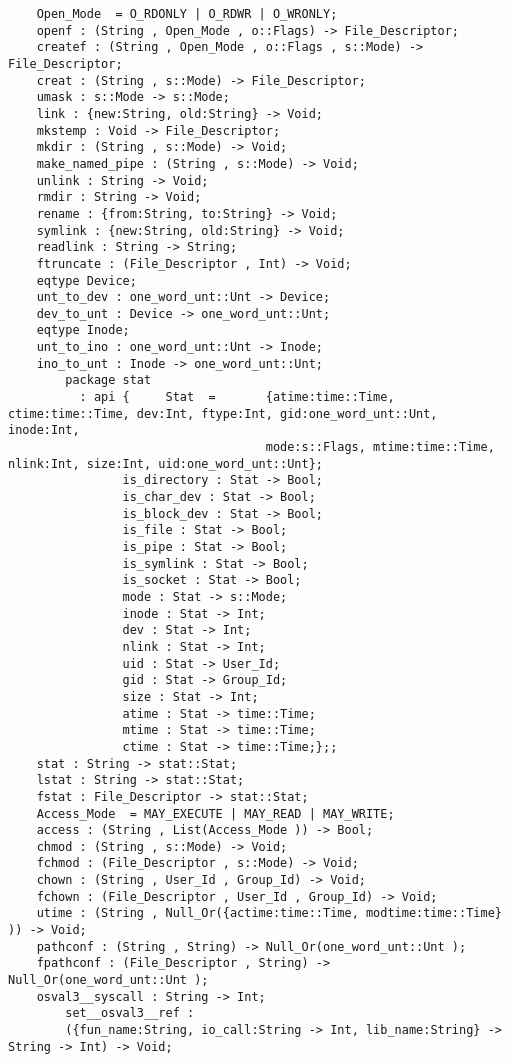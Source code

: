 \begin{verbatim}
    Open_Mode  = O_RDONLY | O_RDWR | O_WRONLY;
    openf : (String , Open_Mode , o::Flags) -> File_Descriptor;
    createf : (String , Open_Mode , o::Flags , s::Mode) -> File_Descriptor;
    creat : (String , s::Mode) -> File_Descriptor;
    umask : s::Mode -> s::Mode;
    link : {new:String, old:String} -> Void;
    mkstemp : Void -> File_Descriptor;
    mkdir : (String , s::Mode) -> Void;
    make_named_pipe : (String , s::Mode) -> Void;
    unlink : String -> Void;
    rmdir : String -> Void;
    rename : {from:String, to:String} -> Void;
    symlink : {new:String, old:String} -> Void;
    readlink : String -> String;
    ftruncate : (File_Descriptor , Int) -> Void;
    eqtype Device;
    unt_to_dev : one_word_unt::Unt -> Device;
    dev_to_unt : Device -> one_word_unt::Unt;
    eqtype Inode;
    unt_to_ino : one_word_unt::Unt -> Inode;
    ino_to_unt : Inode -> one_word_unt::Unt;
        package stat
          : api {     Stat  =       {atime:time::Time, ctime:time::Time, dev:Int, ftype:Int, gid:one_word_unt::Unt, inode:Int,
                                    mode:s::Flags, mtime:time::Time, nlink:Int, size:Int, uid:one_word_unt::Unt};
                is_directory : Stat -> Bool;
                is_char_dev : Stat -> Bool;
                is_block_dev : Stat -> Bool;
                is_file : Stat -> Bool;
                is_pipe : Stat -> Bool;
                is_symlink : Stat -> Bool;
                is_socket : Stat -> Bool;
                mode : Stat -> s::Mode;
                inode : Stat -> Int;
                dev : Stat -> Int;
                nlink : Stat -> Int;
                uid : Stat -> User_Id;
                gid : Stat -> Group_Id;
                size : Stat -> Int;
                atime : Stat -> time::Time;
                mtime : Stat -> time::Time;
                ctime : Stat -> time::Time;};;
    stat : String -> stat::Stat;
    lstat : String -> stat::Stat;
    fstat : File_Descriptor -> stat::Stat;
    Access_Mode  = MAY_EXECUTE | MAY_READ | MAY_WRITE;
    access : (String , List(Access_Mode )) -> Bool;
    chmod : (String , s::Mode) -> Void;
    fchmod : (File_Descriptor , s::Mode) -> Void;
    chown : (String , User_Id , Group_Id) -> Void;
    fchown : (File_Descriptor , User_Id , Group_Id) -> Void;
    utime : (String , Null_Or({actime:time::Time, modtime:time::Time} )) -> Void;
    pathconf : (String , String) -> Null_Or(one_word_unt::Unt );
    fpathconf : (File_Descriptor , String) -> Null_Or(one_word_unt::Unt );
    osval3__syscall : String -> Int;
        set__osval3__ref :
        ({fun_name:String, io_call:String -> Int, lib_name:String} -> String -> Int) -> Void;

\end{verbatim}
